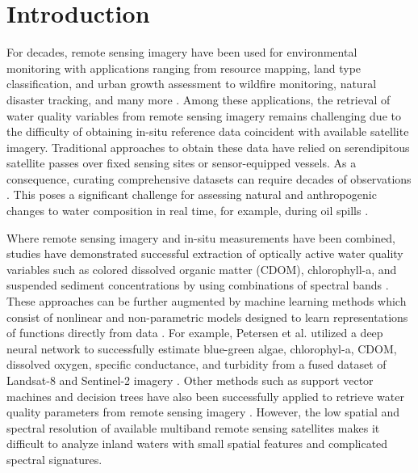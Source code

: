 \documentclass[remotesensing,article,submit,pdftex,moreauthors]{Definitions/mdpi}
\begin{document}
\section{Introduction}

For decades, remote sensing imagery have been used for environmental monitoring with applications ranging from resource mapping, land type classification, and urban growth assessment to wildfire monitoring, natural disaster tracking, and many more \cite{melesse2007remote, joyce2009review}. Among these applications, the retrieval of water quality variables from remote sensing imagery remains challenging due to the difficulty of obtaining in-situ reference data coincident with available satellite imagery. Traditional approaches to obtain these data have relied on serendipitous satellite passes over fixed sensing sites or sensor-equipped vessels. As a consequence, curating comprehensive datasets can require decades of observations \cite{aurin2018remote, ross2019aquasat}. This poses a significant challenge for assessing natural and anthropogenic changes to water composition in real time, for example, during oil spills \cite{fingas2017review}.

Where remote sensing imagery and in-situ measurements have been combined, studies have demonstrated successful extraction of optically active water quality variables such as colored dissolved organic matter (CDOM), chlorophyll-a, and suspended sediment concentrations by using combinations of spectral bands \cite{remote-sensing-finland,bonansea2015using, absalon2023detection}. These approaches can be further augmented by machine learning methods which consist of nonlinear and non-parametric models designed to learn representations of functions directly from data \cite{lary2010artificial}. For example, Petersen et al. utilized a deep neural network to successfully estimate blue-green algae, chlorophyl-a, CDOM, dissolved oxygen, specific conductance, and turbidity from a fused dataset of Landsat-8 and Sentinel-2 imagery \cite{peterson2020deep}. Other methods such as support vector machines and decision trees have also been successfully applied to retrieve water quality parameters from remote sensing imagery \cite{belgiu2016random,sagan2020monitoring}. However, the low spatial and spectral resolution of available multiband remote sensing satellites makes it difficult to analyze inland waters with small spatial features and complicated spectral signatures. 
\end{document}
